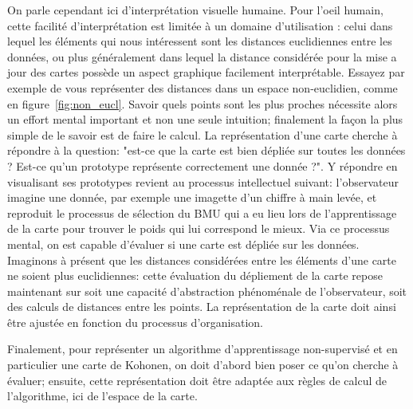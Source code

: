 On parle cependant ici d'interprétation visuelle humaine. Pour l'oeil humain, cette facilité d'interprétation est limitée à un domaine d'utilisation : celui dans lequel les éléments qui nous intéressent sont les distances euclidiennes entre les données, ou plus généralement dans lequel la distance considérée pour la mise a jour des cartes possède un aspect graphique facilement interprétable. Essayez par exemple de vous représenter des distances dans un espace non-euclidien, comme en figure~\ref{fig:non_eucl}. Savoir quels points sont les plus proches nécessite alors un effort mental important et non une seule intuition; finalement la façon la plus simple de le savoir est de faire le calcul. 
La représentation d'une carte cherche à répondre à la question: "est-ce que la carte est bien dépliée sur toutes les données ? Est-ce qu'un prototype représente correctement une donnée ?". Y répondre en visualisant ses prototypes revient au processus intellectuel suivant: l'observateur imagine une donnée, par exemple une imagette d'un chiffre à main levée, et reproduit le processus de sélection du BMU qui a eu lieu lors de l'apprentissage de la carte pour trouver le poids qui lui correspond le mieux. Via ce processus mental, on est capable d'évaluer si une carte est dépliée sur les données. 
Imaginons à présent que les distances considérées entre les éléments d'une carte ne soient plus euclidiennes: cette évaluation du dépliement de la carte repose maintenant sur soit une capacité d'abstraction phénoménale de l'observateur, soit des calculs de distances entre les points. La représentation de la carte doit ainsi être ajustée en fonction du processus d'organisation.

Finalement, pour représenter un algorithme d'apprentissage non-supervisé et en particulier une carte de Kohonen, on doit d'abord bien poser ce qu'on cherche à évaluer; ensuite, cette représentation doit être adaptée aux règles de calcul de l'algorithme, ici de l'espace de la carte. 

